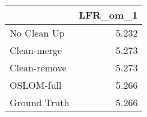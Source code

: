\begin{tabular}{lr}
\toprule
{} & LFR_om_1 \\
\midrule
No Clean Up  &    5.232 \\
Clean-merge  &    5.273 \\
Clean-remove &    5.273 \\
OSLOM-full   &    5.266 \\
Ground Truth &    5.266 \\
\bottomrule
\end{tabular}

